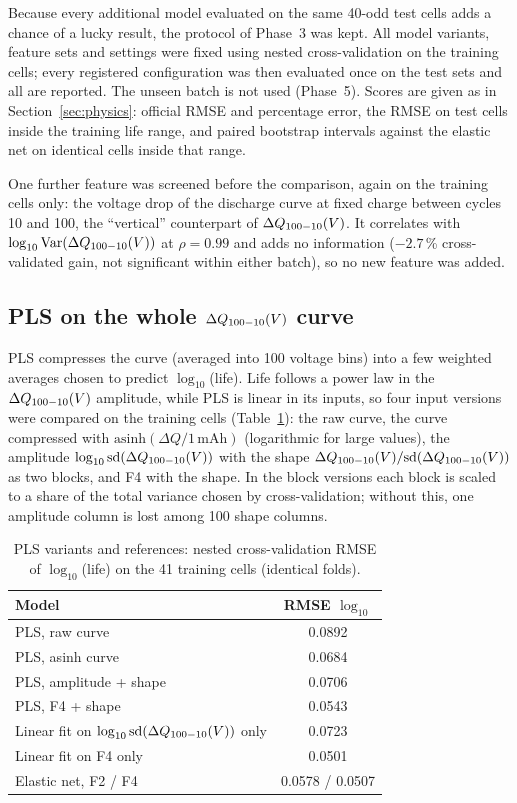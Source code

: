 Because every additional model evaluated on the same 40-odd test cells adds
a chance of a lucky result, the protocol of Phase~3 was kept. All model
variants, feature sets and settings were fixed using nested
cross-validation on the training cells; every registered configuration was
then evaluated once on the test sets and all are reported. The unseen batch
is not used (Phase~5). Scores are given as in Section~\ref{sec:physics}:
official RMSE and percentage error, the RMSE on test cells inside the
training life range, and paired bootstrap intervals against the elastic net
on identical cells inside that range.

One further feature was screened before the comparison, again on the
training cells only: the voltage drop of the discharge curve at fixed
charge between cycles 10 and 100, the ``vertical'' counterpart of $\Delta Q_{100-10}(V)$. It
correlates with $\log_{10}\mathrm{Var}(\Delta Q_{100-10}(V))$ at $\rho=0.99$ and adds no
information ($-2.7$\,\% cross-validated gain, not significant within either
batch), so no new feature was added.

\subsection{PLS on the whole $\Delta Q_{100-10}(V)$ curve}
PLS compresses the curve (averaged into 100 voltage bins) into a few
weighted averages chosen to predict $\log_{10}$(life). Life follows a power
law in the $\Delta Q_{100-10}(V)$ amplitude, while PLS is linear in its inputs, so four input
versions were compared on the training cells (Table~\ref{tab:p4pls}): the
raw curve, the curve compressed with $\mathrm{asinh}(\Delta Q/1\,\mathrm{mAh})$
(logarithmic for large values), the amplitude $\log_{10}\mathrm{sd}(\Delta Q_{100-10}(V))$ with the
shape $\Delta Q_{100-10}(V)/\mathrm{sd}(\Delta Q_{100-10}(V))$ as two blocks, and F4 with the shape. In the
block versions each block is scaled to a share of the total variance chosen
by cross-validation; without this, one amplitude column is lost among 100
shape columns.

\begin{table}[t]
\centering
\caption{PLS variants and references: nested cross-validation RMSE of
$\log_{10}$(life) on the 41 training cells (identical folds).}
\label{tab:p4pls}
\begin{tabular}{@{}lc@{}}
\toprule
Model & RMSE $\log_{10}$ \\
\midrule
PLS, raw curve & 0.0892 \\
PLS, asinh curve & 0.0684 \\
PLS, amplitude + shape & 0.0706 \\
PLS, F4 + shape & 0.0543 \\
\midrule
Linear fit on $\log_{10}\mathrm{sd}(\Delta Q_{100-10}(V))$ only & 0.0723 \\
Linear fit on F4 only & 0.0501 \\
Elastic net, F2 / F4 & 0.0578 / 0.0507 \\
\bottomrule
\end{tabular}
\end{table}

